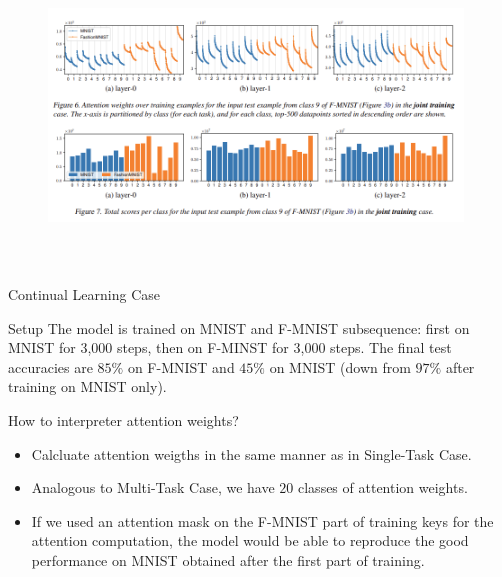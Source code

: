 \documentclass{beamer}
\begin{document}
\begin{frame}
\begin{figure}[h]
    \centering
    \includegraphics[width=11cm, height=8cm]{Multi_task_sample.png}
\end{figure}
\end{frame}

\begin{frame}{Continual Learning Case}
    \begin{block}{Setup}
    The model is trained on MNIST and F-MNIST subsequence:  first on MNIST for 3,000 steps,
then on F-MINST for 3,000 steps. The final test accuracies are $85\%$ on F-MNIST and $45\%$ on MNIST (down from $97\%$ after training on MNIST only).
    \end{block}
    \begin{block}{How to interpreter attention weights?}
        \begin{itemize}
            \item Calcluate attention weigths in the same manner as in Single-Task Case.
            \item Analogous to Multi-Task Case, we have $20$ classes of attention weights. 
            \item If we used an attention mask on the F-MNIST part of training keys for the attention computation, the model would be able to reproduce the good performance on MNIST obtained after the first part of training. 
        \end{itemize}
    \end{block}
\end{frame}
\end{document}
